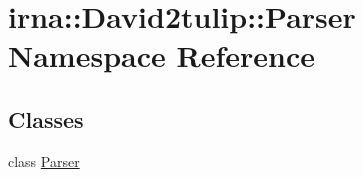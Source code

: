\hypertarget{namespaceirna_1_1David2tulip_1_1Parser}{
\section{irna\-:\-:\-David2tulip\-:\-:\-Parser \-Namespace \-Reference}
\label{namespaceirna_1_1David2tulip_1_1Parser}
}
\subsection*{\-Classes}
\begin{DoxyCompactItemize}
\item 
class \hyperlink{classirna_1_1David2tulip_1_1Parser_1_1Parser}{\-Parser}
\end{DoxyCompactItemize}

